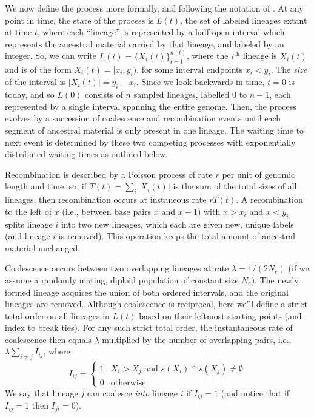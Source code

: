 \documentclass{article}
\begin{document}
We now define the process more formally,
and following the notation of \citet{mcvean_approximating_2005}.
At any point in time, the state of the process is $L(t)$,
the set of labeled lineages extant at time $t$,
where each ``lineage'' is represented by a half-open interval
which represents the ancestral material carried by that lineage,
and labeled by an integer.
So, we can write $L(t) = \{X_i(t)\}_{i=1}^{n(t)}$,
where the $i^\text{th}$ lineage is $X_i(t)$
and is of the form
$X_i(t) = [x_{i}, y_{i})$,
for some interval endpoints $x_{i} < y_{i}$.
The \emph{size} of the interval is $|X_i(t)| = y_{i} - x_{i}$.
Since we look backwards in time, $t=0$ is today, and so
$L(0)$ consists of $n$ sampled lineages, labelled $0$ to $n-1$,
each represented by a single interval spanning the entire genome.
Then, the process evolves by a succession of coalescence and recombination
events until each segment of ancestral material is only present in one lineage.
The waiting time to next event is determined by these two competing processes
with exponentially distributed waiting times as outlined below.

Recombination is described by a Poisson process of rate $r$ per unit of genomic length and time:
so, if $T(t) = \sum_i |X_i(t)|$ is the sum of the total sizes of all lineages,
then recombination occurs at instaneous rate $rT(t)$.
A recombination to the left of $x$
(i.e., between base pairs $x$ and $x-1$)
with $x>x_{i}$ and $x<y_{i}$ splits lineage $i$ into two new lineages,
which each are given new, unique labels
(and lineage $i$ is removed).
This operation keeps the total amount of ancestral material unchanged.

Coalescence occurs between
two overlapping lineages at rate $\lambda = 1/(2N_e)$
(if we assume a randomly mating, diploid population of constant size $N_e$).
The newly formed lineage acquires the union of both ordered intervals, %
and the original lineages are removed.
Although coalescence is reciprocal, here we'll define a strict total order
on all lineages in $L(t)$ based on their leftmost starting points (and index to break ties).
For any such strict total order,
the instantaneous rate of coalescence then equals $\lambda$ multiplied by the number of overlapping pairs,
i.e., $\lambda \sum_{i \neq j} I_{ij}$,
where
\begin{equation} \label{def:coal}
I_{ij} = \begin{cases}
    1 & X_i > X_j \text{ and } s(X_i) \cap s(X_j) \neq \emptyset \\
    0 & \text{otherwise.}
\end{cases}
\end{equation}
We say that lineage $j$ can coalesce \emph{into} lineage $i$ if $I_{ij} = 1$
(and notice that if $I_{ij} = 1$ then $I_{ji} = 0$).
\end{document}
